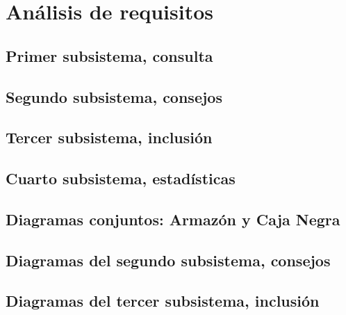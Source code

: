 \documentclass[a4paper, 11pt]{article}
\begin{document}
\newpage
\section{Análisis de requisitos}

\subsection{Primer subsistema, consulta}


\subsection{Segundo subsistema, consejos}


\subsection{Tercer subsistema, inclusión}


\subsection{Cuarto subsistema, estadísticas}


\newpage

\subsection{Diagramas conjuntos: Armazón y Caja Negra}


\subsection{Diagramas del segundo subsistema, consejos}


\subsection{Diagramas del tercer subsistema, inclusión}

\end{document}
